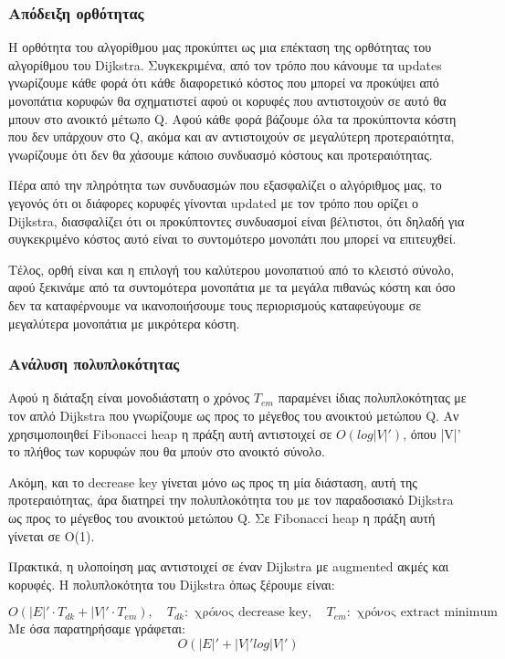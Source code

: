 \documentclass[a4paper,oneside, 11pt]{article}
\begin{document}
\subsubsection{Απόδειξη ορθότητας}
Η ορθότητα του αλγορίθμου μας προκύπτει ως μια επέκταση της ορθότητας του αλγορίθμου του Dijkstra. Συγκεκριμένα, από τον τρόπο που κάνουμε τα updates γνωρίζουμε κάθε φορά ότι κάθε διαφορετικό κόστος που μπορεί να προκύψει από μονοπάτια κορυφών θα σχηματιστεί αφού οι κορυφές που αντιστοιχούν σε αυτό θα μπουν στο ανοικτό μέτωπο Q. Αφού κάθε φορά βάζουμε όλα τα προκύπτοντα κόστη που δεν υπάρχουν στο Q, ακόμα και αν αντιστοιχούν σε μεγαλύτερη προτεραιότητα, γνωρίζουμε ότι δεν θα χάσουμε κάποιο συνδυασμό κόστους και προτεραιότητας. \bigbreak 

Πέρα από την πληρότητα των συνδυασμών που εξασφαλίζει ο αλγόριθμος μας, το γεγονός ότι οι διάφορες κορυφές γίνονται updated με τον τρόπο που ορίζει ο Dijkstra, διασφαλίζει ότι οι προκύπτοντες συνδυασμοί είναι βέλτιστοι, ότι δηλαδή για συγκεκριμένο κόστος αυτό είναι το συντομότερο μονοπάτι που μπορεί να επιτευχθεί. \bigbreak 

Τέλος, ορθή είναι και η επιλογή του καλύτερου μονοπατιού από το κλειστό σύνολο, αφού ξεκινάμε από τα συντομότερα μονοπάτια με τα μεγάλα πιθανώς κόστη και όσο δεν τα καταφέρνουμε να ικανοποιήσουμε τους περιορισμούς καταφεύγουμε σε μεγαλύτερα μονοπάτια με μικρότερα κόστη.



\subsubsection{Ανάλυση πολυπλοκότητας}
Αφού η διάταξη είναι μονοδιάστατη ο χρόνος $T_{em}$ παραμένει ίδιας πολυπλοκότητας με τον απλό Dijkstra που γνωρίζουμε ως προς το μέγεθος του ανοικτού μετώπου Q. Αν χρησιμοποιηθεί Fibonacci heap η πράξη αυτή αντιστοιχεί σε $Ο(log|V|')$, όπου |V|' το πλήθος των κορυφών που θα μπούν στο ανοικτό σύνολο. \bigbreak

Ακόμη, και το decrease key γίνεται μόνο ως προς τη μία διάσταση, αυτή της προτεραιότητας, άρα διατηρεί την πολυπλοκότητα του με τον παραδοσιακό Dijkstra ως προς το μέγεθος του ανοικτού μετώπου Q. Σε Fibonacci heap η πράξη αυτή γίνεται σε O(1). \bigbreak 

Πρακτικά, η υλοποίηση μας αντιστοιχεί σε έναν Dijkstra με augmented ακμές και κορυφές. Η πολυπλοκότητα του Dijkstra όπως ξέρουμε είναι: 

$$
O(|E|'\cdot T_{dk} + |V|'\cdot T_{em}), \quad T_{dk}: \textrm{ χρόνος decrease key}, \quad T_{em}: \textrm{ χρόνος extract minimum}
$$
Με όσα παρατηρήσαμε γράφεται:
$$
O(|E|' + |V|' log|V|')
$$
\end{document}
